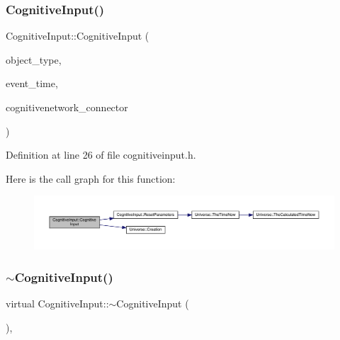 \subsubsection{\texorpdfstring{Cognitive\+Input()}{CognitiveInput()}\hspace{0.1cm}{\footnotesize\ttfamily [4/4]}}
{\footnotesize\ttfamily Cognitive\+Input\+::\+Cognitive\+Input (\begin{DoxyParamCaption}\item[{unsigned int}]{object\+\_\+type,  }\item[{std\+::chrono\+::time\+\_\+point$<$ \hyperlink{universe_8h_a0ef8d951d1ca5ab3cfaf7ab4c7a6fd80}{Clock} $>$}]{event\+\_\+time,  }\item[{\hyperlink{class_cognitive_network}{Cognitive\+Network} \&}]{cognitivenetwork\+\_\+connector }\end{DoxyParamCaption})\hspace{0.3cm}{\ttfamily [inline]}}



Definition at line 26 of file cognitiveinput.\+h.

Here is the call graph for this function\+:
\nopagebreak
\begin{figure}[H]
\begin{center}
\leavevmode
\includegraphics[width=350pt]{class_cognitive_input_a230ebb8f019af7e0bff51c13bc10c580_cgraph}
\end{center}
\end{figure}
\mbox{\label{class_cognitive_input_a68007661b8fdd7ef39213a1fb3c06bd7}} 
\subsubsection{\texorpdfstring{$\sim$\+Cognitive\+Input()}{~CognitiveInput()}}
{\footnotesize\ttfamily virtual Cognitive\+Input\+::$\sim$\+Cognitive\+Input (\begin{DoxyParamCaption}{ }\end{DoxyParamCaption})\hspace{0.3cm}{\ttfamily [inline]}, {\ttfamily [virtual]}}

